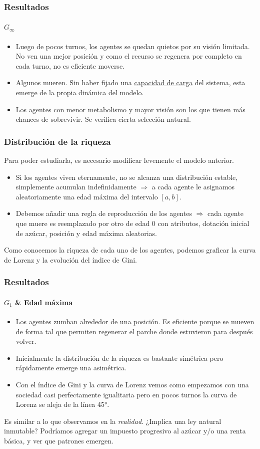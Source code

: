 \documentclass[11pt]{beamer}
\begin{document}
\begin{frame}
	\label{g-inf}
\frametitle{Resultados}
\framesubtitle{$G_{\infty}$}
\begin{itemize}
	\item Luego de pocos turnos, los agentes se quedan quietos por su visión limitada. No ven una mejor posición y como el recurso se regenera por completo en cada turno, no es eficiente moverse.
	\item Algunos mueren. Sin haber fijado una \hyperlink{carry-cap}{capacidad de carga} del sistema, esta emerge de la propia dinámica del modelo.
	\item Los agentes con menor metabolismo y mayor visión son los que tienen más chances de sobrevivir. Se verifica cierta selección natural.
\end{itemize}

\end{frame}


\begin{frame}
\frametitle{Distribución de la riqueza}

Para poder estudiarla, es necesario modificar levemente el modelo anterior.
\begin{itemize}
	\item Si los agentes viven eternamente, no se alcanza una distribución estable, simplemente acumulan indefinidamente $\Rightarrow$ a cada agente le asignamos aleatoriamente una edad máxima del intervalo $[a,b]$.
	\item Debemos añadir una regla de reproducción de los agentes $\Rightarrow$ cada agente que muere es reemplazado por otro de edad 0 con atributos, dotación inicial de azúcar, posición y edad máxima aleatorias.
	
\end{itemize}

Como conocemos la riqueza de cada uno de los agentes, podemos graficar la curva de Lorenz y la evolución del índice de Gini.
\end{frame}

\begin{frame}
\frametitle{Resultados}
\framesubtitle{$G_1$ \& Edad máxima}
\begin{itemize}
	\item Los agentes zumban alrededor de una posición. Es eficiente porque se mueven de forma tal que permiten regenerar el parche donde estuvieron para después volver.
	\item Inicialmente la distribución de la riqueza es bastante simétrica pero rápidamente emerge una asimétrica.
	\item Con el índice de Gini y la curva de Lorenz vemos como empezamos con una sociedad casi perfectamente igualitaria pero en pocos turnos la curva de Lorenz se aleja de la línea 45°.
\end{itemize}

Es similar a lo que observamos en la \textit{realidad}. ¿Implica una ley natural inmutable? 
Podríamos agregar un impuesto progresivo al azúcar y/o una renta básica, y ver que patrones emergen.

\end{frame}
\end{document}
